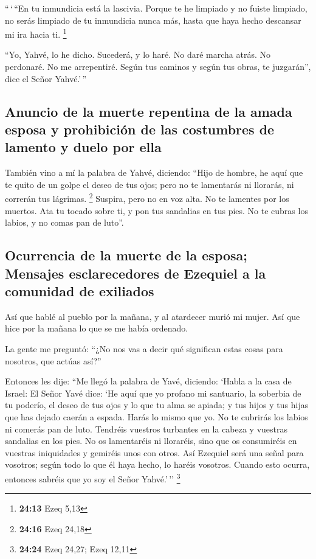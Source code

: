 \begin{paracol}{2}
 ``\,`\,``En tu inmundicia está la lascivia. Porque te he
limpiado y no fuiste limpiado, no serás limpiado de tu inmundicia nunca
más, hasta que haya hecho descansar mi ira hacia ti. \footnote{\textbf{24:13}
  Ezeq 5,13}

 ``Yo, Yahvé, lo he dicho. Sucederá, y lo haré. No daré
marcha atrás. No perdonaré. No me arrepentiré. Según tus caminos y según
tus obras, te juzgarán'', dice el Señor Yahvé.'\,''

\hypertarget{anuncio-de-la-muerte-repentina-de-la-amada-esposa-y-prohibiciuxf3n-de-las-costumbres-de-lamento-y-duelo-por-ella}{%
\subsection{Anuncio de la muerte repentina de la amada esposa y
prohibición de las costumbres de lamento y duelo por
ella}\label{anuncio-de-la-muerte-repentina-de-la-amada-esposa-y-prohibiciuxf3n-de-las-costumbres-de-lamento-y-duelo-por-ella}}

 También vino a mí la palabra de Yahvé, diciendo:
 ``Hijo de hombre, he aquí que te quito de un golpe el
deseo de tus ojos; pero no te lamentarás ni llorarás, ni correrán tus
lágrimas. \footnote{\textbf{24:16} Ezeq 24,18}  Suspira,
pero no en voz alta. No te lamentes por los muertos. Ata tu tocado sobre
ti, y pon tus sandalias en tus pies. No te cubras los labios, y no comas
pan de luto''.

\hypertarget{ocurrencia-de-la-muerte-de-la-esposa-mensajes-esclarecedores-de-ezequiel-a-la-comunidad-de-exiliados}{%
\subsection{Ocurrencia de la muerte de la esposa; Mensajes
esclarecedores de Ezequiel a la comunidad de
exiliados}\label{ocurrencia-de-la-muerte-de-la-esposa-mensajes-esclarecedores-de-ezequiel-a-la-comunidad-de-exiliados}}

 Así que hablé al pueblo por la mañana, y al atardecer
murió mi mujer. Así que hice por la mañana lo que se me había ordenado.

 La gente me preguntó: ``¿No nos vas a decir qué
significan estas cosas para nosotros, que actúas así?''

 Entonces les dije: ``Me llegó la palabra de Yavé,
diciendo:  `Habla a la casa de Israel: El Señor Yavé
dice: `He aquí que yo profano mi santuario, la soberbia de tu poderío,
el deseo de tus ojos y lo que tu alma se apiada; y tus hijos y tus hijas
que has dejado caerán a espada.  Harás lo mismo que yo.
No te cubrirás los labios ni comerás pan de luto. 
Tendréis vuestros turbantes en la cabeza y vuestras sandalias en los
pies. No os lamentaréis ni lloraréis, sino que os consumiréis en
vuestras iniquidades y gemiréis unos con otros.  Así
Ezequiel será una señal para vosotros; según todo lo que él haya hecho,
lo haréis vosotros. Cuando esto ocurra, entonces sabréis que yo soy el
Señor Yahvé.'\,'' \footnote{\textbf{24:24} Ezeq 24,27; Ezeq 12,11}


\end{paracol}
